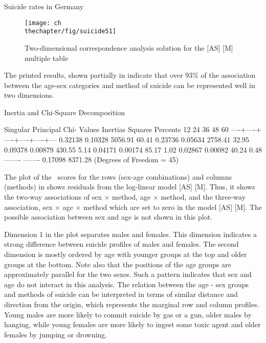 \begin{Example}[suicide1]{Suicide rates in Germany}
\begin{figure}[htb]
  \centering
  \texttt{[image: ch\\thechapter/fig/suicide51]}
  \caption{Two-dimensional correspondence analysis
solution for the [AS] [M] multiple table}\label{fig:suicide51}
\end{figure}

The printed results, shown partially in  indicate that over 93\% of the association between the age-sex categories and method of
suicide can be represented well in two dimensions.

\begin{Output}[htb]
\caption{Chi-Square Decomposition for suicide data}\label{out:suicide5}
\begin{output}
                   Inertia and Chi-Square Decomposition

     Singular  Principal Chi-
     Values    Inertias  Squares Percents   12   24   36   48   60
                                         ----+----+----+----+----+---
     0.32138   0.10328   5056.91  60.41%
     0.23736   0.05634   2758.41  32.95%
     0.09378   0.00879    430.55   5.14%
     0.04171   0.00174     85.17   1.02%
     0.02867   0.00082     40.24   0.48%
               -------   -------
               0.17098   8371.28 (Degrees of Freedom = 45)
\end{output}
\end{Output}

The plot of the \CA\ scores for the rows (sex-age combinations) and
columns (methods) in 
shows residuals from the log-linear model [AS] [M].
Thus, it shows the two-way associations of sex \(\times\) method, age
\(\times\) method, and the three-way association, sex \(\times\) age
\(\times\) method which are set to zero in the model [AS] [M].  The
possible association between sex and age is not shown in this plot.

Dimension 1 in the plot separates males and females.  This dimension
indicates a strong difference between suicide profiles of males and
females.  The second dimension is mostly ordered by age with younger
groups at the top and older groups at the bottom.  Note also that the
positions of the age groups are approximately parallel for the two
sexes.  Such a pattern indicates that sex and age do not interact in
this analysis.  The relation between the age - sex groups and methods
of suicide can be interpreted in terms of similar distance and
direction from the origin, which represents the marginal row and
column profiles.  Young males are more likely to commit suicide by
gas or a gun, older males by hanging, while young females are more
likely to ingest some toxic agent and older females by jumping or
drowning.


\end{Example}
